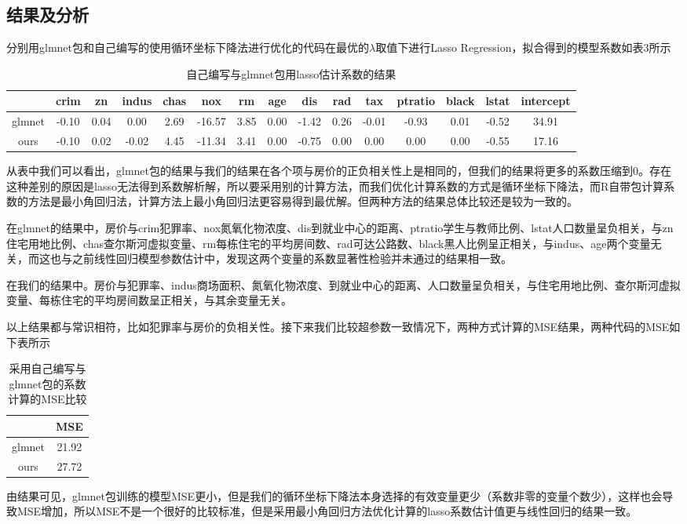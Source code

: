     \subsection{结果及分析}
    分别用glmnet包和自己编写的使用循环坐标下降法进行优化的代码在最优的$\lambda$取值下进行Lasso Regression，拟合得到的模型系数如表3所示
    \begin{table}[H]
        \centering
        \caption{自己编写与glmnet包用lasso估计系数的结果}
        \begin{tabular}{|c|c|c|c|c|c|c|c|c|c|c|c|c|c|c|}
        \hline
               & crim  & zn   & indus & chas & nox    & rm   & age  & dis   & rad  & tax   & ptratio & black & lstat & intercept \\ \hline
        glmnet & -0.10 & 0.04 & 0.00  & 2.69 & -16.57 & 3.85 & 0.00 & -1.42 & 0.26 & -0.01 & -0.93   & 0.01  & -0.52 & 34.91     \\ \hline
        ours   & -0.10 & 0.02 & -0.02 & 4.45 & -11.34 & 3.41 & 0.00 & -0.75 & 0.00 & 0.00  & 0.00    & 0.00  & -0.55 & 17.16     \\ \hline
        \end{tabular}
    \end{table}
    从表中我们可以看出，glmnet包的结果与我们的结果在各个项与房价的正负相关性上是相同的，但我们的结果将更多的系数压缩到0。存在这种差别的原因是lasso无法得到系数解析解，所以要采用别的计算方法，而我们优化计算系数的方式是循环坐标下降法，而R自带包计算系数的方法是最小角回归法，计算方法上最小角回归法更容易得到最优解。但两种方法的结果总体比较还是较为一致的。
    
    在glmnet的结果中，房价与crim犯罪率、nox氮氧化物浓度、dis到就业中心的距离、ptratio学生与教师比例、lstat人口数量呈负相关，与zn住宅用地比例、chas查尔斯河虚拟变量、rm每栋住宅的平均房间数、rad可达公路数、black黑人比例呈正相关，与indus、age两个变量无关，而这也与之前线性回归模型参数估计中，发现这两个变量的系数显著性检验并未通过的结果相一致。

    在我们的结果中。房价与犯罪率、indus商场面积、氮氧化物浓度、到就业中心的距离、人口数量呈负相关，与住宅用地比例、查尔斯河虚拟变量、每栋住宅的平均房间数呈正相关，与其余变量无关。

    以上结果都与常识相符，比如犯罪率与房价的负相关性。接下来我们比较超参数一致情况下，两种方式计算的MSE结果，两种代码的MSE如下表所示
    \begin{table}[H]
        \centering
        \caption{采用自己编写与glmnet包的系数计算的MSE比较}
        \begin{tabular}{|c|c|}
        \hline
               & MSE   \\ \hline
        glmnet & 21.92 \\ \hline
        ours   & 27.72 \\ \hline
        \end{tabular}
    \end{table}
    由结果可见，glmnet包训练的模型MSE更小，但是我们的循环坐标下降法本身选择的有效变量更少（系数非零的变量个数少），这样也会导致MSE增加，所以MSE不是一个很好的比较标准，但是采用最小角回归方法优化计算的lasso系数估计值更与线性回归的结果一致。
